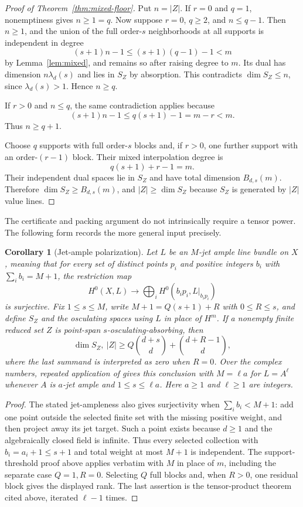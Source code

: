 \documentclass[11pt]{article}
\newtheorem{corollary}[theorem]{Corollary}
\theoremstyle{definition}
\theoremstyle{remark}
\theoremstyle{plain}
\begin{document}
\begin{proof}[Proof of Theorem~\ref{thm:mixed-floor}]
Put $n=|Z|$.  If $r=0$ and $q=1$, nonemptiness gives $n\geq1=q$.  Now
suppose $r=0$, $q\geq2$, and $n\leq q-1$.  Then $n\geq1$, and the union of the full
order-$s$ neighborhoods at all supports is independent in degree
\[
 (s+1)n-1\leq(s+1)(q-1)-1<m
\]
by Lemma~\ref{lem:mixed}, and remains so after raising degree to $m$.
Its dual has dimension $n\lambda_d(s)$ and lies in $S_Z$ by absorption.
This contradicts $\dim S_Z\leq n$, since $\lambda_d(s)>1$.  Hence $n\geq q$.

If $r>0$ and $n\leq q$, the same contradiction applies because
\[
 (s+1)n-1\leq q(s+1)-1=m-r<m.
\]
Thus $n\geq q+1$.

Choose $q$ supports with full order-$s$ blocks and, if $r>0$, one further
support with an order-$(r-1)$ block.  Their mixed interpolation degree is
\[
 q(s+1)+r-1=m.
\]
Their independent dual spaces lie in $S_Z$ and have total dimension
$B_{d,s}(m)$.  Therefore $\dim S_Z\geq B_{d,s}(m)$, and
$|Z|\geq\dim S_Z$ because $S_Z$ is generated by $|Z|$ value lines.
\end{proof}

The certificate and packing argument do not intrinsically require a tensor
power.  The following form records the more general input precisely.

\begin{corollary}[Jet-ample polarization]\label{cor:jetample}
Let $L$ be an $M$-jet ample line bundle on $X$, meaning that for every set of
distinct points $p_i$ and positive integers $b_i$ with
$\sum_i b_i=M+1$, the restriction map
\[
 H^0(X,L)\longrightarrow
 \bigoplus_i H^0\!\left(b_i p_i,L|_{b_i p_i}\right)
\]
is surjective.  Fix $1\leq s\leq M$, write
$M+1=Q(s+1)+R$ with $0\leq R\leq s$, and define $S_Z$ and the osculating
spaces using $L$ in place of $H^m$.  If a nonempty finite reduced set $Z$ is
point-span $s$-osculating-absorbing, then
\[
 \dim S_Z,\ |Z|\geq
 Q\binom{d+s}{d}+\binom{d+R-1}{d},
\]
where the last summand is interpreted as zero when $R=0$.
Over the complex numbers, repeated application of
\cite[Proposition~2.3]{BDRS1999} gives this conclusion with $M=\ell a$ for
$L=A^{\ell}$ whenever $A$ is $a$-jet ample and $1\leq s\leq\ell a$.
Here $a\geq1$ and $\ell\geq1$ are integers.
\end{corollary}

\begin{proof}
The stated jet-ampleness also gives surjectivity when $\sum_i b_i<M+1$:
add one point outside the selected finite set with the missing positive
weight, and then project away its jet target.  Such a point exists because
$d\geq1$ and the algebraically closed field is infinite.  Thus every selected
collection with $b_i=a_i+1\leq s+1$ and total weight at most $M+1$ is
independent.  The support-threshold proof above applies verbatim with $M$ in
place of $m$, including the separate case $Q=1,R=0$.  Selecting $Q$ full
blocks and, when $R>0$, one residual block gives the displayed rank.  The
last assertion is the tensor-product theorem cited above, iterated $\ell-1$
times.
\end{proof}
\end{document}

